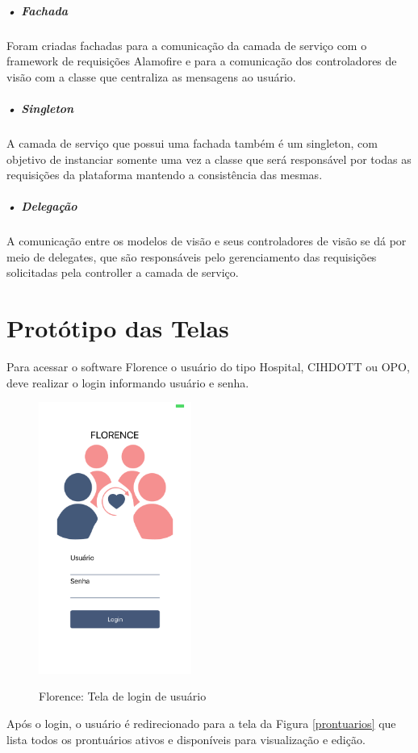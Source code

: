 \documentclass[portuguese,oneside]{tcc}
\begin{document}
\subparagraph{• Fachada}
Foram criadas fachadas para a comunicação da camada de serviço com o framework de requisições Alamofire e para a comunicação dos controladores de visão com a classe que centraliza as mensagens ao usuário.

\subparagraph{• Singleton}
A camada de serviço que possui uma fachada também é um singleton, com objetivo de instanciar somente uma vez a classe que será responsável por todas as requisições da plataforma mantendo a consistência das mesmas.

\subparagraph{• Delegação}
A comunicação entre os modelos de visão e seus controladores de visão se dá por meio de delegates, que são responsáveis pelo gerenciamento das requisições solicitadas pela controller a camada de serviço.

\newpage

\section{Protótipo das Telas}
Para acessar o software Florence o usuário do tipo Hospital, CIHDOTT ou OPO, deve realizar o login informando usuário e senha.

\begin{figure}[htp]
\centering
\caption{Florence: Tela de login de usuário}
\includegraphics[width=5cm, frame]{login}
\label{fig:login}
\end{figure}

Após o login, o usuário é redirecionado para a tela da Figura \ref{prontuarios} que lista todos os prontuários ativos e disponíveis para visualização e edição.
\end{document}
